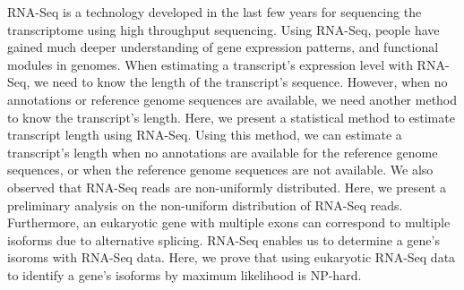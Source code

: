 
\begin{eabstract} 
	RNA-Seq is a technology developed in the last few years for sequencing the transcriptome using high throughput sequencing. 
	Using RNA-Seq, people have gained much deeper understanding of gene expression patterns, 
	and functional modules in genomes. 
	When estimating a transcript's expression level with RNA-Seq, 
	we need to know the length of the transcript's sequence. 
	However, when no annotations or reference genome sequences are available, 
	we need another method to know the transcript's length. 
	Here, we present a statistical method to estimate transcript length using RNA-Seq. 
	Using this method, we can estimate a transcript's length when no annotations are available for the reference genome sequences, or when the reference genome sequences are not available. 
	We also observed that RNA-Seq reads are non-uniformly distributed. 
	Here, we present a preliminary analysis on the non-uniform distribution of RNA-Seq reads. 
	Furthermore, an eukaryotic gene with multiple exons can correspond to multiple isoforms due to alternative splicing. 
	RNA-Seq enables us to determine a gene's isoroms with RNA-Seq data. 
	Here, we prove that using eukaryotic RNA-Seq data to identify a gene's isoforms by maximum likelihood is NP-hard.
\end{eabstract}





